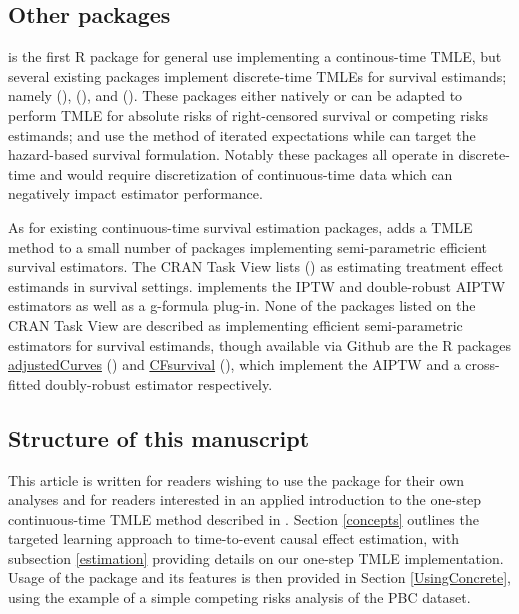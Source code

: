 \documentclass{report}
\newcommand{\1}{\ensuremath{\mathbf{1}}}
\begin{document}
\subsection{Other packages}
\label{otherpkgs}
 is the first R package for general use implementing a continous-time TMLE, but several existing packages implement discrete-time TMLEs for survival estimands; namely  (\cite{schwab_ltmle_2020}),  (\cite{sofrygin_stremr_2017}), and  (\cite{benkeser_survtmle_2019}). These packages either natively or can be adapted to perform TMLE for absolute risks of right-censored survival or competing risks estimands;  and  use the method of iterated expectations while  can target the hazard-based survival formulation. Notably these packages all operate in discrete-time and would require discretization of continuous-time data which can negatively impact estimator performance.

As for existing continuous-time survival estimation packages,  adds a TMLE method to a small number of packages implementing semi-parametric efficient survival estimators. The  CRAN Task View lists  (\cite{gerds_riskregression_2022}) as estimating treatment effect estimands in survival settings.  implements the IPTW and double-robust AIPTW estimators as well as a g-formula plug-in. None of the packages listed on the  CRAN Task View are described as implementing efficient semi-parametric estimators for survival estimands, though available via Github are the R packages \href{https://github.com/RobinDenz1/adjustedCurves}{adjustedCurves} (\cite{denz_comparison_2022}) and \href{https://github.com/tedwestling/CFsurvival}{CFsurvival} (\cite{westling_inference_2021}), which implement the AIPTW and a cross-fitted doubly-robust estimator respectively.

\subsection{Structure of this manuscript}
\label{sec:org1327aeb}
This article is written for readers wishing to use the  package for their own analyses and for readers interested in an applied introduction to the one-step continuous-time TMLE method described in \cite{rytgaard_one-step_2021}. Section \ref{concepts} outlines the targeted learning approach to time-to-event causal effect estimation, with subsection \ref{estimation} providing details on our one-step TMLE implementation. Usage of the  package and its features is then provided in Section \ref{UsingConcrete}, using the example of a simple competing risks analysis of the PBC dataset. 
\end{document}

